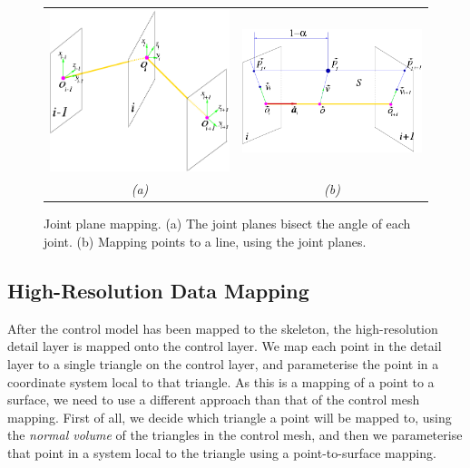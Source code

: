 \documentclass[10pt,oneside,fleqn,a4paper]{book}
\begin{document}
\begin{figure}
\begin{center}
\begin{tabular}{cc}
\includegraphics[width=6cm]{../images/jointplanes} &
\includegraphics[width=6cm]{../images/point-to-line} \\
{\it (a)} & {\it (b)}
\end{tabular}
\caption[Joint planes and point-to-line mapping]{\label{fig:jointplanes} Joint plane mapping. (a) The joint planes bisect the angle of each joint. (b) Mapping points to a line, using the joint planes.}
\end{center}
\end{figure}

\subsection{\label{sec:chaindetail}High-Resolution Data Mapping}
After the control model has been mapped to the skeleton, the high-resolution detail layer is mapped onto the control layer. We map each point in the detail layer to a single triangle on the control layer, and parameterise the point in a coordinate system local to that triangle. As this is a mapping of a point to a surface, we need to use a different approach than that of the control mesh mapping. First of all, we decide which triangle a point will be mapped to, using the {\it normal volume} of the triangles in the control mesh, and then we parameterise that point in a system local to the triangle using a point-to-surface mapping.
\end{document}
